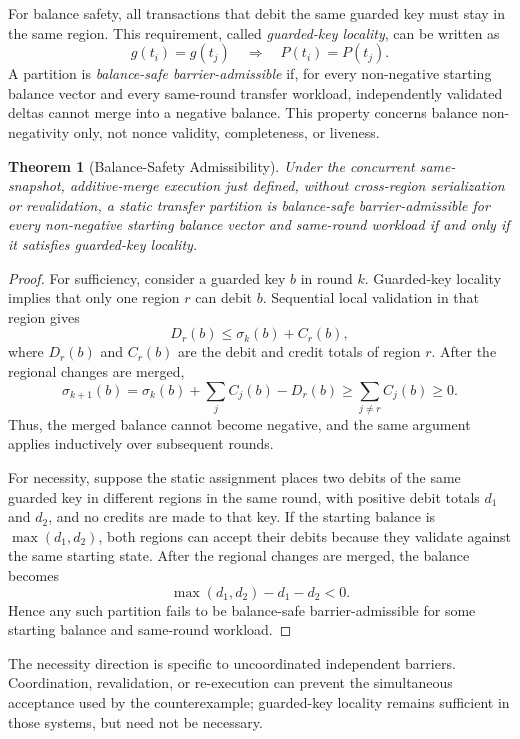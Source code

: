 \documentclass[conference,letterpaper]{IEEEtran}
\newtheorem{theorem}{Theorem}
\begin{document}
For balance safety, all transactions that debit the same guarded key must stay
in the same region. This requirement, called \emph{guarded-key locality}, can
be written as
\[
g(t_i)=g(t_j)\quad\Longrightarrow\quad P(t_i)=P(t_j).
\]
A partition is \emph{balance-safe barrier-admissible} if, for every non-negative
starting balance vector and every same-round transfer workload, independently
validated deltas cannot merge into a negative balance. This property concerns
balance non-negativity only, not nonce validity, completeness, or liveness.

\begin{theorem}[Balance-Safety Admissibility]
\label{thm:barrier_admissibility}
Under the concurrent same-snapshot, additive-merge execution just defined,
without cross-region serialization or revalidation, a static transfer
partition is balance-safe barrier-admissible for every non-negative starting
balance vector and same-round workload if and only if it satisfies guarded-key
locality.
\end{theorem}

\begin{proof}
For sufficiency, consider a guarded key $b$ in round $k$. Guarded-key locality
implies that only one region $r$ can debit $b$. Sequential local validation in
that region gives
\[
D_r(b)\leq \sigma_k(b)+C_r(b),
\]
where $D_r(b)$ and $C_r(b)$ are the debit and credit totals of region $r$.
After the regional changes are merged,
\[
\sigma_{k+1}(b)
=\sigma_k(b)+\sum_j C_j(b)-D_r(b)
\geq \sum_{j\neq r}C_j(b)\geq0.
\]
Thus, the merged balance cannot become negative, and the same argument applies
inductively over subsequent rounds.

For necessity, suppose the static assignment places two debits of the same
guarded key in different regions in the same round, with
positive debit totals $d_1$ and $d_2$, and no credits are made to that key. If
the starting balance is $\max(d_1,d_2)$, both regions can accept their debits
because they validate against the same starting state. After the regional
changes are merged, the balance becomes
\[
\max(d_1,d_2)-d_1-d_2<0.
\]
Hence any such partition fails to be balance-safe barrier-admissible for some
starting balance and same-round workload.
\end{proof}

The necessity direction is specific to uncoordinated independent barriers.
Coordination, revalidation, or re-execution can prevent the simultaneous
acceptance used by the counterexample; guarded-key locality remains sufficient
in those systems, but need not be necessary.
\end{document}
